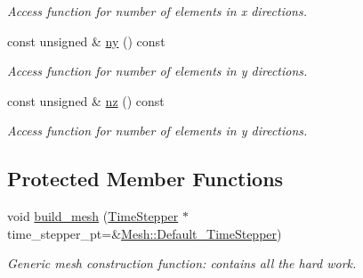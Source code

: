 \begin{DoxyCompactItemize}
\begin{DoxyCompactList}\small\item\em Access function for number of elements in x directions. \end{DoxyCompactList}\item 
const unsigned \& \hyperlink{classoomph_1_1SimpleCubicMesh_a16979ec3b0e88fb37730415190021c1c}{ny} () const
\begin{DoxyCompactList}\small\item\em Access function for number of elements in y directions. \end{DoxyCompactList}\item 
const unsigned \& \hyperlink{classoomph_1_1SimpleCubicMesh_ad78725440e4e87598fd9339653b28e61}{nz} () const
\begin{DoxyCompactList}\small\item\em Access function for number of elements in y directions. \end{DoxyCompactList}\end{DoxyCompactItemize}
\subsection*{Protected Member Functions}
\begin{DoxyCompactItemize}
\item 
void \hyperlink{classoomph_1_1SimpleCubicMesh_aea141bf600aaed7c7c9ccfa3f4f1edfc}{build\+\_\+mesh} (\hyperlink{classoomph_1_1TimeStepper}{Time\+Stepper} $\ast$time\+\_\+stepper\+\_\+pt=\&\hyperlink{classoomph_1_1Mesh_a12243d0fee2b1fcee729ee5a4777ea10}{Mesh\+::\+Default\+\_\+\+Time\+Stepper})
\begin{DoxyCompactList}\small\item\em Generic mesh construction function\+: contains all the hard work. \end{DoxyCompactList}\end{DoxyCompactItemize}
